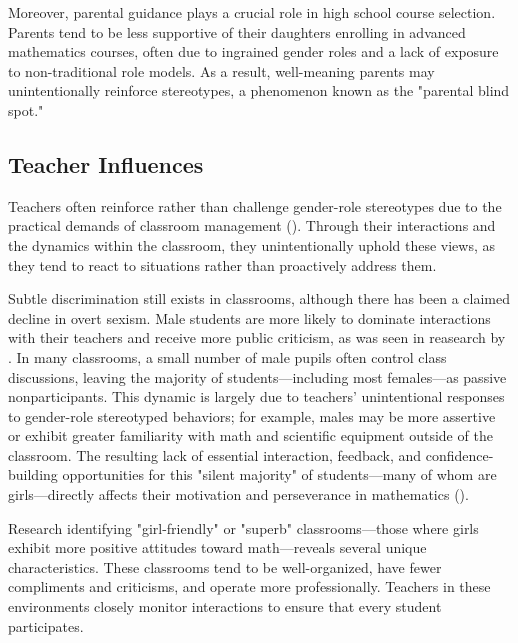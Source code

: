 Moreover, parental guidance plays a crucial role in high school course selection. Parents tend to be less supportive of their daughters enrolling in advanced mathematics courses, often due to ingrained gender roles and a lack of exposure to non-traditional role models. As a result, well-meaning parents may unintentionally reinforce stereotypes, a phenomenon known as the "parental blind spot."

\subsection{Teacher Influences}
Teachers often reinforce rather than challenge gender-role stereotypes due to the practical demands of classroom management (\cite{Gunderson2012}). Through their interactions and the dynamics within the classroom, they unintentionally uphold these views, as they tend to react to situations rather than proactively address them. 

Subtle discrimination still exists in classrooms, although there has been a claimed decline in overt sexism. Male students are more likely to dominate interactions with their teachers and receive more public criticism, as was seen in reasearch by \textcite{VanLooRydell2014}. In many classrooms, a small number of male pupils often control class discussions, leaving the majority of students—including most females—as passive nonparticipants. This dynamic is largely due to teachers' unintentional responses to gender-role stereotyped behaviors; for example, males may be more assertive or exhibit greater familiarity with math and scientific equipment outside of the classroom. The resulting lack of essential interaction, feedback, and confidence-building opportunities for this "silent majority" of students—many of whom are girls—directly affects their motivation and perseverance in mathematics (\cite{Smith22}).

Research identifying "girl-friendly" or "superb" classrooms—those where girls exhibit more positive attitudes toward math—reveals several unique characteristics. These classrooms tend to be well-organized, have fewer compliments and criticisms, and operate more professionally. Teachers in these environments closely monitor interactions to ensure that every student participates. 

